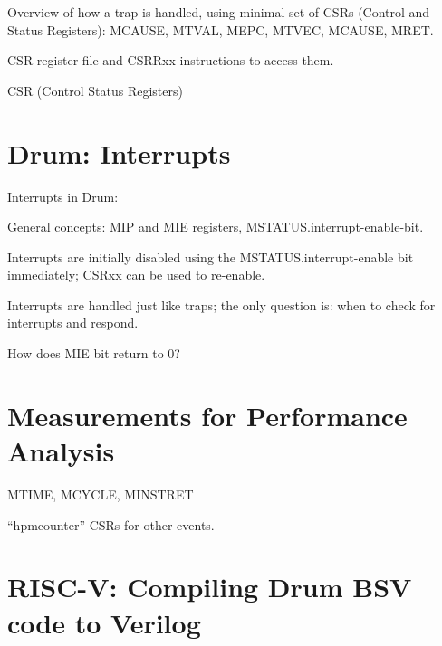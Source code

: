Overview of how a trap is handled, using minimal set of CSRs (Control
and Status Registers): MCAUSE, MTVAL, MEPC, MTVEC, MCAUSE, MRET.

CSR register file and CSRRxx instructions to access them.

CSR (Control Status Registers)


\section{Drum: Interrupts}

Interrupts in Drum:
\begin{tightlist}
  \item General concepts: MIP and MIE registers, MSTATUS.interrupt-enable-bit.

  \item Interrupts are initially disabled using the
        MSTATUS.interrupt-enable bit immediately; CSRxx can be used to
        re-enable.

  \item Interrupts are handled just like traps; the only question is:
        when to check for interrupts and respond.

  \item How does MIE bit return to 0?

\end{tightlist}


\section{Measurements for Performance Analysis}

MTIME, MCYCLE, MINSTRET

``hpmcounter'' CSRs for other events.


\section{RISC-V: Compiling Drum BSV code to Verilog}

\label{Sec_FSMs_Drum_compile_to_verilog}


